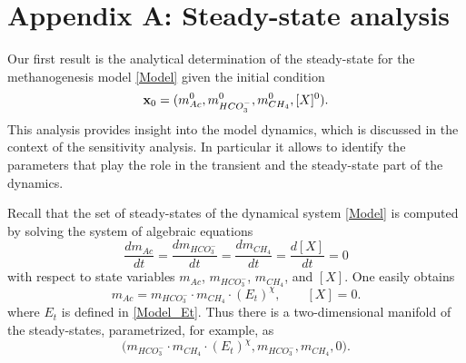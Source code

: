 \documentclass[a4paper, 12pt]{article}
\begin{document}
\section*{Appendix A: Steady-state analysis}\label{Sec:ss}
Our first result is the analytical determination of  the steady-state  for the methanogenesis model \eqref{Model}  given the  initial condition  
\begin{equation}\label{Res:ic}
\mathbf{x}_0=(m^0_{Ac}, m^0_{HCO_3^-}, m^0_{CH_4}, [X]^0).
\end{equation}
This analysis provides insight into the model dynamics, which is discussed in the context of the sensitivity analysis.  In particular it allows to identify the parameters that play the role in the transient and the steady-state part of the dynamics. 

\smallskip

Recall that the set of steady-states of the dynamical system \eqref{Model} is computed by solving the system of algebraic equations
\[
\frac{dm_{Ac}}{dt}=\frac{dm_{HCO_3^-}}{dt}=\frac{dm_{CH_4}}{dt}=\frac{d[X]}{dt}=0
\]
with respect to state variables $m_{Ac}$, $m_{HCO_3^-}$, $m_{CH_4}$, and $ [X]$. One easily obtains
\begin{equation}\label{Res:sseq}
m_{Ac} = m_{HCO_3^-}\cdot  m_{CH_4}  \cdot (E_t)^{\chi}, \qquad [X]=0.
\end{equation}
where $E_t$ is defined in \eqref{Model_Et}. Thus there is a two-dimensional manifold of the steady-states, parametrized, for example, as
\begin{equation}\label{Res:sseq_par}
\Big(m_{HCO_3^-}\cdot  m_{CH_4}  \cdot (E_t)^{\chi}, m_{HCO_3^-}, m_{CH_4} ,0 \Big).
\end{equation}
\end{document}
